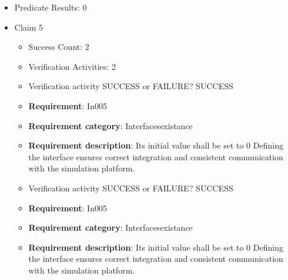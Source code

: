 \documentclass{article}
\begin{document}
\begin{itemize}
\begin{itemize}
						\item \textbf{Requirement}: In004 
						\item \textbf{Requirement category}: Interfacesexistance 
						\item \textbf{Requirement description}: Its initial value shall be set to 0 Defining the interface ensures correct integration and consistent communication with the simulation platform.
					
					\item Verification activity SUCCESS or FAILURE? SUCCESS
		
						\item \textbf{Requirement}: In004 
						\item \textbf{Requirement category}: Interfacesexistance 
						\item \textbf{Requirement description}: Its initial value shall be set to 0 Defining the interface ensures correct integration and consistent communication with the simulation platform.
					
				\end{itemize}
				
									    
				\item Predicate Results: 0

  				  \item Claim 5
				\begin{itemize}
			    	\item Success Count: 2 
			    	\item Verification Activities: 2
					\item Verification activity SUCCESS or FAILURE? SUCCESS
		
						\item \textbf{Requirement}: In005 
						\item \textbf{Requirement category}: Interfacesexistance 
						\item \textbf{Requirement description}: Its initial value shall be set to 0 Defining the interface ensures correct integration and consistent communication with the simulation platform.
					
					\item Verification activity SUCCESS or FAILURE? SUCCESS
		
						\item \textbf{Requirement}: In005 
						\item \textbf{Requirement category}: Interfacesexistance 
						\item \textbf{Requirement description}: Its initial value shall be set to 0 Defining the interface ensures correct integration and consistent communication with the simulation platform.
					

\end{itemize}
\end{itemize}
\end{document}
